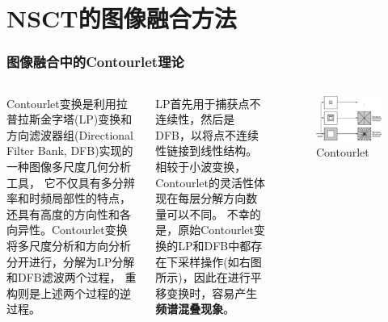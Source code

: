\documentclass[10pt,aspectratio=43,mathserif]{beamer}
\begin{document}
\section[NSCT]{NSCT的图像融合方法}
    \begin{frame}
		  \frametitle{\textbf{图像融合中的Contourlet理论}}
            \begin{columns}
                \footnotesize
                Contourlet变换是利用拉普拉斯金字塔(LP)变换和方向滤波器组(Directional Filter Bank, DFB)实现的一种图像多尺度几何分析工具，
它不仅具有多分辨率和时频局部性的特点，还具有高度的方向性和各向异性。Contourlet变换将多尺度分析和方向分析分开进行，分解为LP分解和DFB滤波两个过程，
重构则是上述两个过程的逆过程。

LP首先用于捕获点不连续性，然后是DFB，以将点不连续性链接到线性结构。相较于小波变换，Contourlet的灵活性体现在每层分解方向数量可以不同。
不幸的是，原始Contourlet变换的LP和DFB中都存在下采样操作(如右图所示)，因此在进行平移变换时，容易产生\textbf{频谱混叠现象}。

                \begin{figure}[!t]
                    \centering
                    \includegraphics[width=1.1\textwidth]{./figures/nsct/Contourlet.png}
                    \caption{Contourlet}
                    \label{fig:CTandNSCT}
                \end{figure}
        \end{columns}
    \end{frame}
\end{document}
